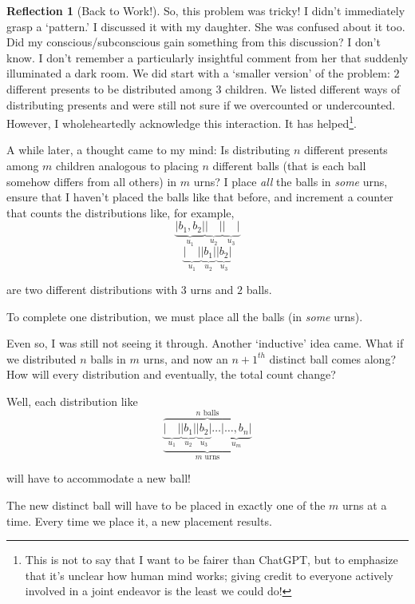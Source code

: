 \documentclass[11pt]{book}
\theoremstyle{definition}
\theoremstyle{plain}
\theoremstyle{definition}
\theoremstyle{problemstyle}
\theoremstyle{remark}
\theoremstyle{definition}
\newtheorem{reflection}{Reflection}
\begin{document}
\begin{reflection}[Back to Work!]

    So, this problem was tricky! I didn't immediately grasp a `pattern.' I discussed it with my daughter. She was confused about it too.  Did my conscious/subconscious gain something from this discussion? I don't know. I don't remember a particularly insightful comment from her that suddenly illuminated a dark room. We did start with a `smaller version' of the problem: $2$ different presents to be distributed among $3$ children. We listed different ways of distributing presents and were still not sure if we overcounted or undercounted. However, I wholeheartedly acknowledge this interaction. It has helped\footnote{This is not to say that I want to be fairer than ChatGPT, but to emphasize that it's unclear how human mind works; giving credit to everyone actively involved in a joint endeavor is the least we could do!}. 

    A while later, a thought came to my mind: Is distributing $n$ different presents among $m$ children analogous to placing $n$ different balls (that is each ball somehow differs from all others) in $m$ urns? I place \emph{all} the balls in \emph{some} urns, ensure that I haven't placed the balls like that before, and increment a counter that counts the distributions like, for example, 
    \[
        \underbrace{|b_1,b_2|}_{u_1}\underbrace{|\quad|}_{u_2}\underbrace{|\quad|}_{u_3}
    \]
    \[
        \underbrace{|\quad|}_{u_1}\underbrace{|b_1|}_{u_2}\underbrace{|b_2|}_{u_3}
    \]

    are two different distributions with $3$ urns and $2$ balls.

    To complete one distribution, we must place all the balls (in \emph{some} urns).

    Even so, I was still not seeing it through. Another `inductive' idea came. What if we distributed $n$ balls in $m$ urns, and now an $n+1^{th}$ distinct ball comes along? How will every distribution and eventually, the total count change? 

    Well, each distribution like
    \[
        \overbrace{
        \underbrace{\underbrace{|\quad|}_{u_1}\underbrace{|b_1|}_{u_2}\underbrace{|b_2|}_{u_3}\dots\underbrace{|\dots,b_n|}_{u_m}}_{m\text{ urns}}
    }^{n\text{ balls}}
    \]

    will have to accommodate a new ball!

    The new distinct ball will have to be placed in exactly one of the $m$ urns at a time. Every time we place it, a new placement results.  


\end{reflection}
\end{document}
